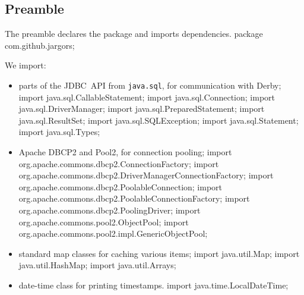 \documentclass{article}
\def\nwendcode{\endtrivlist \endgroup}      %
\let\nwdocspar=\par
\theoremstyle{definition}                   %
\begin{document}
\subsection{Preamble}
\label{sec:preamble}
The preamble declares the package and imports dependencies.
\nwenddocs{}\endmoddef{}
package com.github.jargors;
\nwendcode{}\nwdocspar
We import:
\begin{itemize}
\item parts of the JDBC~API from {\tt{}java.sql}, for communication with Derby;
\nwenddocs{}\plusendmoddef
import java.sql.CallableStatement;   import java.sql.Connection;
import java.sql.DriverManager;       import java.sql.PreparedStatement;
import java.sql.ResultSet;           import java.sql.SQLException;
import java.sql.Statement;           import java.sql.Types;
\nwendcode{}\item Apache DBCP2 and Pool2, for connection pooling;
\nwenddocs{}\plusendmoddef
import org.apache.commons.dbcp2.ConnectionFactory;
import org.apache.commons.dbcp2.DriverManagerConnectionFactory;
import org.apache.commons.dbcp2.PoolableConnection;
import org.apache.commons.dbcp2.PoolableConnectionFactory;
import org.apache.commons.dbcp2.PoolingDriver;
import org.apache.commons.pool2.ObjectPool;
import org.apache.commons.pool2.impl.GenericObjectPool;
\nwendcode{}\item standard map classes for caching various items;
\nwenddocs{}\plusendmoddef
import java.util.Map;
import java.util.HashMap;
import java.util.Arrays;
\nwendcode{}\item date-time class for printing timestamps.
\nwenddocs{}\plusendmoddef
import java.time.LocalDateTime;
\nwendcode{}\nwdocspar
\end{itemize}
\end{document}
